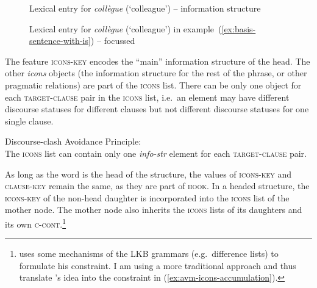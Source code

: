 \begin{figure}[h] 
\caption{Lexical entry for \emph{collègue} (`colleague') -- information structure}\label{avm:collegue-info-str}
\end{figure}

\begin{figure}[h]
\caption{Lexical entry for \emph{collègue} (`colleague') in example~(\ref{ex:basis-sentence-with-is}) -- focussed}\label{avm:collegue-focus}
\end{figure}

The feature \textsc{icons-key} encodes the ``main'' information structure of the head. The other \emph{icons} objects (the information structure for the rest of the phrase, or other pragmatic relations) are part of the \textsc{icons} list. There can be only one object for each \textsc{target-clause} pair in the \textsc{icons} list, i.e.\ an element may have different discourse statuses for different clauses but not different discourse statuses for one single clause.

\ea Discourse-clash Avoidance Principle:\\
The \textsc{icons} list can contain only one \emph{info-str} element for each \textsc{target-clause} pair. 
\label{rule:discourse-clash-avoid}
\z 

As long as the word is the head of the structure, the values of \textsc{icons-key} and \textsc{clause-key} remain the same, as they are part of \textsc{hook}. In a headed structure, the \textsc{icons-key} of the non-head daughter is incorporated into the \textsc{icons} list of the mother node. The mother node also inherits the \textsc{icons} lists of its daughters and its own \textsc{c-cont}.\footnote{\citet{Song.2017} uses some mechanisms of the LKB grammars (e.g.\ difference lists) to formulate his constraint. I am using a more traditional approach and thus translate \citeauthor{Song.2017}'s idea into the constraint in (\ref{ex:avm-icons-accumulation}).}

